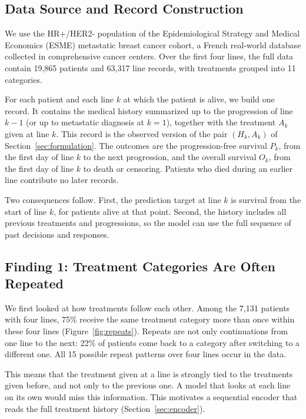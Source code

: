 \documentclass[a4paper,10pt]{article}
\begin{document}
\subsection{Data Source and Record Construction}

We use the HR+/HER2- population of the Epidemiological Strategy and Medical Economics (ESME) metastatic breast cancer cohort, a French real-world database collected in comprehensive cancer centers. Over the first four lines, the full data contain 19,865 patients and 63,317 line records, with treatments grouped into 11 categories.

For each patient and each line $k$ at which the patient is alive, we build one record. It contains the medical history summarized up to the progression of line $k-1$ (or up to metastatic diagnosis at $k=1$), together with the treatment $A_k$ given at line $k$. This record is the observed version of the pair $(H_k, A_k)$ of Section~\ref{sec:formulation}. The outcomes are the progression-free survival $P_k$, from the first day of line $k$ to the next progression, and the overall survival $O_k$, from the first day of line $k$ to death or censoring. Patients who died during an earlier line contribute no later records.

Two consequences follow. First, the prediction target at line $k$ is survival from the start of line $k$, for patients alive at that point. Second, the history includes all previous treatments and progressions, so the model can use the full sequence of past decisions and responses.

\subsection{Finding 1: Treatment Categories Are Often Repeated}

We first looked at how treatments follow each other. Among the 7,131 patients with four lines, 75\% receive the same treatment category more than once within these four lines (Figure~\ref{fig:repeats}). Repeats are not only continuations from one line to the next: 22\% of patients come back to a category after switching to a different one. All 15 possible repeat patterns over four lines occur in the data.

This means that the treatment given at a line is strongly tied to the treatments given before, and not only to the previous one. A model that looks at each line on its own would miss this information. This motivates a sequential encoder that reads the full treatment history (Section~\ref{sec:encoder}).
\end{document}
